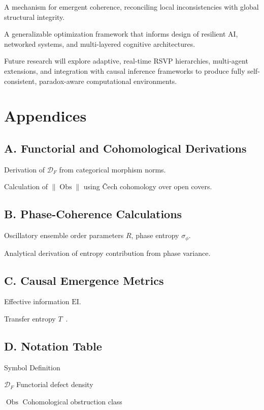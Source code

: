 \documentclass[12pt]{article}
\theoremstyle{plain}
\begin{document}
A mechanism for emergent coherence, reconciling local inconsistencies with global structural integrity.

A generalizable optimization framework that informs design of resilient AI, networked systems, and multi-layered cognitive architectures.

Future research will explore adaptive, real-time RSVP hierarchies, multi-agent extensions, and integration with causal inference frameworks to produce fully self-consistent, paradox-aware computational environments.

\section*{Appendices}

\subsection*{A. Functorial and Cohomological Derivations}

Derivation of \(\mathcal{D}_F\) from categorical morphism norms.

Calculation of \(\|\operatorname{Obs}\|\) using Čech cohomology over open covers.

\subsection*{B. Phase-Coherence Calculations}

Oscillatory ensemble order parameters \(R\), phase entropy \(\sigma_\phi\).

Analytical derivation of entropy contribution from phase variance.

\subsection*{C. Causal Emergence Metrics}

Effective information \(\text{EI}\).

Transfer entropy \(T\)~\citep{Yuan2024}.

\subsection*{D. Notation Table}

Symbol	Definition

\(\mathcal{D}_F\)	Functorial defect density

\(\operatorname{Obs}\)	Cohomological obstruction class
\end{document}
